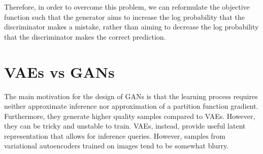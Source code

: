 Therefore, in order to overcome this problem, we can reformulate the objective function such that the generator aims to increase the log probability
that the discriminator makes a mistake, rather than aiming to decrease the log
probability that the discriminator makes the correct prediction.

\section{VAEs vs GANs}
The main motivation for the design of GANs is that the learning process
requires neither approximate inference nor approximation of a partition function gradient. Furthermore, they generate higher quality samples compared to VAEs. However, they can be tricky and unstable to train.\newline\newline
VAEs, instead, provide useful latent representation that allows for inference queries. However, samples from variational autoencoders trained on images tend to be somewhat blurry.
